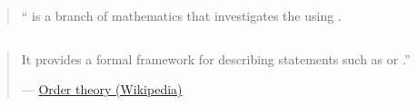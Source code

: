 \begin{frame}{}
	\begin{quote}
		`` is a branch of mathematics that
		investigates the 
		using .
  \end{quote}

  \begin{columns}
  \end{columns}

  \pause
  \vspace{0.30cm}
  \begin{quote}
		It provides a formal framework for describing statements
		such as 
    or .''

    \vspace{1em}
		\hfill --- \href{https://en.wikipedia.org/wiki/Order\_theory}{Order theory (Wikipedia)}
	\end{quote}
\end{frame}

\begin{frame}{}
\end{frame}
